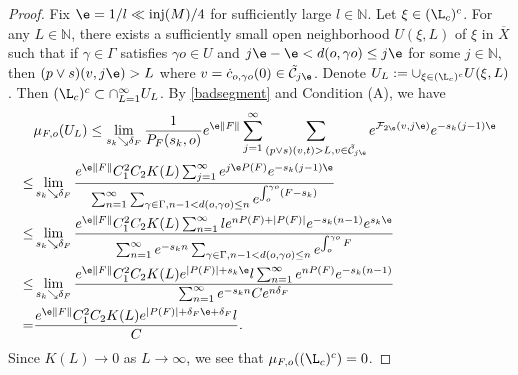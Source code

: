 \documentclass[11pt]{amsart}
\theoremstyle{definition}
\newcommand{\CC}{\mathbb{C}}
\def\CC{{\mathcal C}}
\newcommand{\F}{\mathcal{F}}
\def\NN{{\mathbb N}}
\def\inj{{\text{inj}}}
\def\c{\gamma}   \def\C{\Gamma}
\def\d{\delta}   %
\begin{document}
\begin{proof}
Fix $\e=1/l\ll\inj(M)/4$ for sufficiently large $l\in \NN$. Let $\xi\in (\L_c)^c$. For any $L\in \NN$, there exists a sufficiently small open neighborhood $U(\xi,L)$ of $\xi$ in $\overline{X}$ such that if $\c\in \C$ satisfies $\c o\in U$ and $j\e-\e<d(o, \c o)\le j\e$ for some $j\in \NN$, then $(p\vee s)(v,j\e)>L$ where $v=\dot c_{o,\c o}(0)\in \tilde\CC_{j\e}$. Denote $U_L:=\cup_{\xi\in (\L_c)^c}U(\xi,L)$. Then $(\L_c)^c\subset \cap_{L=1}^\infty U_L$. By \eqref{badsegment} and Condition (A), we have
\begin{equation*}
    \begin{aligned}
&\mu_{F,o}(U_L)\le \lim_{s_k\searrow \d_F}\frac{1}{P_F(s_k,o)}e^{\e\|F\|}\sum_{j=1}^\infty\sum_{(p\vee s)(v,t)>L, v\in \tilde\CC_{j\e}}e^{\F_{2\e}(v,j\e)}e^{-s_k(j-1)\e}\\
\le &\lim_{s_k\searrow \d_F}\frac{ e^{\e\|F\|}C_1^2C_2 K(L)\sum_{j=1}^\infty e^{j\e P(F)}e^{-s_k(j-1)\e}}{\sum_{n=1}^\infty\sum_{\c\in \C, n-1< d(o, \c o)\le n}e^{\int_o^{\c o}(F-s_k)}}\\
\le &\lim_{s_k\searrow \d_F}\frac{ e^{\e\|F\|}C_1^2C_2 K(L)\sum_{n=1}^\infty l e^{nP(F)+|P(F)|}e^{-s_k(n-1)}e^{s_k\e}}{\sum_{n=1}^\infty e^{-s_kn}\sum_{\c\in \C, n-1< d(o, \c o)\le n}e^{\int_o^{\c o}F}}\\
\le &\lim_{s_k\searrow \d_F}\frac{ e^{\e\|F\|}C_1^2C_2 K(L)e^{|P(F)|+s_k\e}l\sum_{n=1}^\infty e^{nP(F)}e^{-s_k(n-1)}}{\sum_{n=1}^\infty e^{-s_kn}Ce^{n\d_F}}\\
= &\frac{e^{\e\|F\|}C_1^2C_2 K(L)e^{|P(F)|+\d_F\e+\d_F}l}{C}.
    \end{aligned}
\end{equation*}
Since $K(L)\to 0$ as $L\to \infty$, we see that $\mu_{F,o}((\L_c)^c)=0$.
\end{proof}
\end{document}
